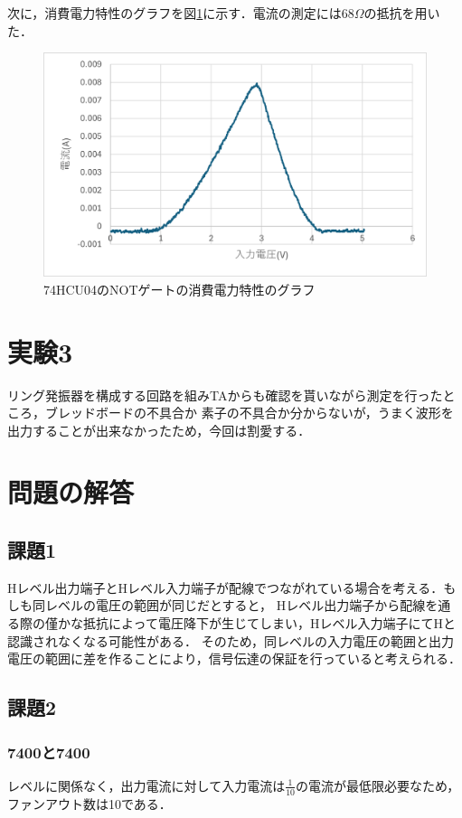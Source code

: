 \documentclass{jlreq}
\numberwithin{equation}{section}
\begin{document}
次に，消費電力特性のグラフを図\ref{fig:power_feature}に示す．電流の測定には$68\Omega$の抵抗を用いた．
\begin{figure}[H]
  \centering
  \includegraphics{assets/power_feature.png}
  \caption{74HCU04のNOTゲートの消費電力特性のグラフ}
  \label{fig:power_feature}
\end{figure}

\section{実験3}
リング発振器を構成する回路を組みTAからも確認を貰いながら測定を行ったところ，ブレッドボードの不具合か
素子の不具合か分からないが，うまく波形を出力することが出来なかったため，今回は割愛する．

\section{問題の解答}
\subsection{課題1}
Hレベル出力端子とHレベル入力端子が配線でつながれている場合を考える．もしも同レベルの電圧の範囲が同じだとすると，
Hレベル出力端子から配線を通る際の僅かな抵抗によって電圧降下が生じてしまい，Hレベル入力端子にてHと認識されなくなる可能性がある．
そのため，同レベルの入力電圧の範囲と出力電圧の範囲に差を作ることにより，信号伝達の保証を行っていると考えられる．

\subsection{課題2}
\subsubsection{7400と7400}
レベルに関係なく，出力電流に対して入力電流は$\frac{1}{10}$の電流が最低限必要なため，ファンアウト数は10である．
\end{document}
